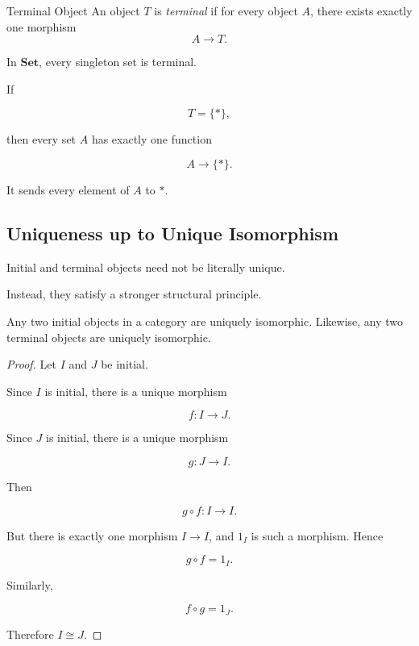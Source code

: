 \begin{definitionbox}{Terminal Object}
An object \(T\) is \emph{terminal} if for every object \(A\), there exists
exactly one morphism
\[ A\to T. \]
\end{definitionbox}

In \(\mathbf{Set}\), every singleton set is terminal.

If

\[ T=\{*\}, \]

then every set \(A\) has exactly one function

\[ A\to\{*\}. \]

It sends every element of \(A\) to \(*\).

\subsection{Uniqueness up to Unique Isomorphism}
\label{subsec:unique-up-to-isomorphism}

Initial and terminal objects need not be literally unique.

Instead, they satisfy a stronger structural principle.

\begin{theorem}
Any two initial objects in a category are uniquely isomorphic.
Likewise, any two terminal objects are uniquely isomorphic.
\end{theorem}

\begin{proof}
Let \(I\) and \(J\) be initial.

Since \(I\) is initial, there is a unique morphism

\[ f:I\to J. \]

Since \(J\) is initial, there is a unique morphism

\[ g:J\to I. \]

Then

\[ g\circ f:I\to I. \]

But there is exactly one morphism \(I\to I\), and \(1_I\) is such a
morphism. Hence

\[ g\circ f=1_I. \]

Similarly,

\[ f\circ g=1_J. \]

Therefore \(I\cong J\).
\end{proof}

